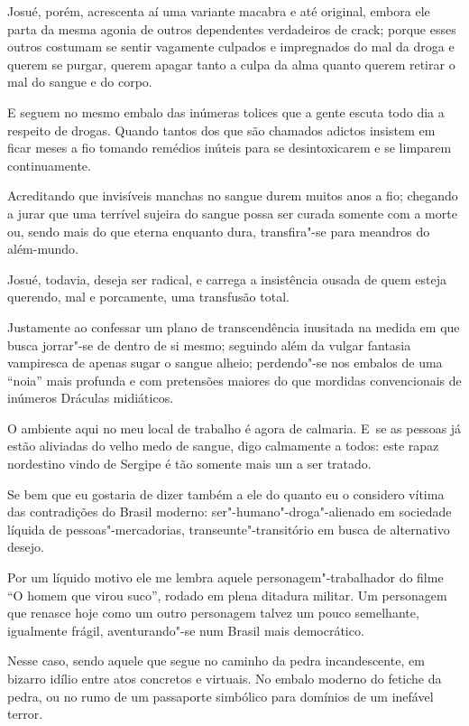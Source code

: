 Josué, porém, acrescenta aí uma variante macabra e até original, embora
ele parta da mesma agonia de outros dependentes verdadeiros de crack;
porque esses outros costumam se sentir vagamente culpados e impregnados
do mal da droga e querem se purgar, querem apagar tanto a culpa da alma
quanto querem retirar o mal do sangue e do corpo.

E seguem no mesmo embalo das inúmeras tolices que a gente escuta todo
dia a respeito de drogas. Quando tantos dos que são chamados adictos
insistem em ficar meses a fio tomando remédios inúteis para se
desintoxicarem e se limparem continuamente.

 

Acreditando que invisíveis manchas no sangue durem muitos anos a fio;
chegando a jurar que uma terrível sujeira do sangue possa ser curada
somente com a morte ou, sendo mais do que eterna enquanto dura,
transfira"-se para meandros do além-mundo.

Josué, todavia, deseja ser radical, e carrega a insistência ousada de
quem esteja querendo, mal e porcamente, uma transfusão total.

Justamente ao confessar um plano de transcendência inusitada na medida
em que busca jorrar"-se de dentro de si mesmo; seguindo além da vulgar
fantasia vampiresca de apenas sugar o sangue alheio; perdendo"-se nos
embalos de uma ``noia'' mais profunda e com pretensões maiores do que
mordidas convencionais de inúmeros Dráculas midiáticos.

\asterisc{}

O ambiente aqui no meu local de trabalho é agora de calmaria. E~se as
pessoas já estão aliviadas do velho medo de sangue, digo calmamente a
todos: este rapaz nordestino vindo de Sergipe é tão somente mais um a
ser tratado.

Se bem que eu gostaria de dizer também a ele do quanto eu o considero
vítima das contradições do Brasil moderno: ser"-humano"-droga"-alienado
em sociedade líquida de pessoas"-mercadorias, transeunte"-transitório em
busca de alternativo desejo.

Por um líquido motivo ele me lembra aquele personagem"-trabalhador do
filme ``O homem que virou suco'', rodado em plena ditadura militar. Um
personagem que renasce hoje como um outro personagem talvez um pouco
semelhante, igualmente frágil, aventurando"-se num Brasil mais
democrático.

Nesse caso, sendo aquele que segue no caminho da pedra incandescente, em
bizarro idílio entre atos concretos e virtuais. No embalo moderno do
fetiche da pedra, ou no rumo de um passaporte simbólico para domínios de
um inefável terror.

